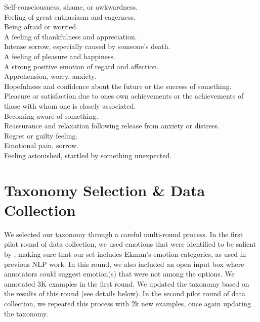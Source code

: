 \documentclass[11pt,a4paper]{article}
\begin{document}
Self-consciousness, shame, or awkwardness.\\
Feeling of great enthusiasm and eagerness.\\
Being afraid or worried.\\
A feeling of thankfulness and appreciation.\\
Intense sorrow, especially caused by someone's death.\\
A feeling of pleasure and happiness.\\
A strong positive emotion of regard and affection.\\
Apprehension, worry, anxiety.\\
Hopefulness and confidence about the future or the success of something.\\
Pleasure or satisfaction due to ones own achievements or the achievements of those with whom one is closely associated.\\
Becoming aware of something.\\
Reassurance and relaxation following release from anxiety or distress.\\
Regret or guilty feeling.\\
Emotional pain, sorrow.\\
Feeling astonished, startled by something unexpected.







\section{Taxonomy Selection \& Data Collection}
\label{sec:appendix_taxonomy_selection}
We selected our taxonomy through a careful multi-round process. In the first pilot round of data collection, we used emotions that were identified to be salient by \citet{cowen2017self}, making sure that our set includes Ekman’s emotion categories, as used in previous NLP work. In this round, we also included an open input box where annotators could suggest emotion(s) that were not among the options. We annotated 3K examples in the first round. We updated the taxonomy based on the results of this round (see details below). In the second pilot round of data collection, we repeated this process with 2k new examples, once again updating the taxonomy.
\end{document}
